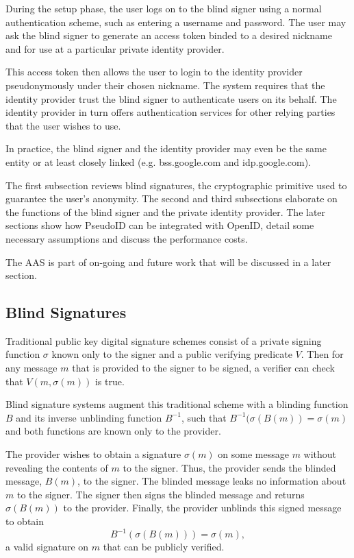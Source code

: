 \documentclass{llncs}
\begin{document}
During the setup phase, the user logs on to the blind signer using a normal
authentication scheme, such as entering a username and password. The user may
ask the blind signer to generate an access token binded to a desired nickname
and for use at a particular private identity provider.

This access token then allows the user to login to the identity provider
pseudonymously under their chosen nickname. The system requires that the
identity provider trust the blind signer to authenticate users on its behalf.
The identity provider in turn offers authentication services for other relying
parties that the user wishes to use.

In practice, the blind signer and the identity provider may even be the same
entity or at least closely linked (e.g. bss.google.com and idp.google.com).

The first subsection reviews blind signatures, the cryptographic primitive used
to guarantee the user's anonymity. The second and third subsections elaborate on
the functions of the blind signer and the private identity provider. The later
sections show how PseudoID can be integrated with OpenID, detail some necessary
assumptions and discuss the performance costs.

The AAS is part of on-going and future work that will be discussed in a later
section.

\subsection{Blind Signatures}

Traditional public key digital signature schemes \cite{DH76} consist of a
private signing function $\sigma$ known only to the signer and a public verifying
predicate $V$. Then for any message $m$ that is provided to the signer to be
signed, a verifier can check that $V(m, \sigma(m))$ is true.

Blind signature systems \cite{Cha82} augment this traditional scheme with a
blinding function $B$ and its inverse unblinding function $B^{-1}$, such that
$B^{-1}(\sigma(B(m)) = \sigma(m)$ and both functions are known only to the
provider.

The provider wishes to obtain a signature $\sigma(m)$ on some message $m$ without
revealing the contents of $m$ to the signer. Thus, the provider sends the
blinded message, $B(m)$, to the signer. The blinded message leaks no information
about $m$ to the signer. The signer then signs the blinded message and returns
$\sigma(B(m))$ to the provider. Finally, the provider unblinds this signed
message to obtain
$$B^{-1}(\sigma(B(m))) = \sigma(m),$$
a valid signature on $m$ that can be publicly verified.
\end{document}
